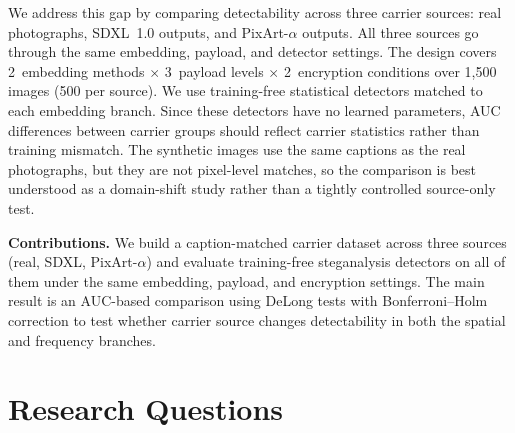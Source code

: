 \documentclass[10pt,twocolumn,a4paper]{article}
\begin{document}
We address this gap by comparing detectability across three carrier sources: real photographs, SDXL~1.0 outputs, and PixArt-$\alpha$ outputs. All three sources go through the same embedding, payload, and detector settings. The design covers 2~embedding methods $\times$ 3~payload levels $\times$ 2~encryption conditions over 1{,}500 images (500 per source). We use training-free statistical detectors matched to each embedding branch. Since these detectors have no learned parameters, AUC differences between carrier groups should reflect carrier statistics rather than training mismatch. The synthetic images use the same captions as the real photographs, but they are not pixel-level matches, so the comparison is best understood as a domain-shift study rather than a tightly controlled source-only test.

\smallskip
\noindent\textbf{Contributions.} We build a caption-matched carrier dataset across three sources (real, SDXL, PixArt-$\alpha$) and evaluate training-free steganalysis detectors on all of them under the same embedding, payload, and encryption settings. The main result is an AUC-based comparison using DeLong tests with Bonferroni--Holm correction to test whether carrier source changes detectability in both the spatial and frequency branches.

\section{Research Questions}
\end{document}
